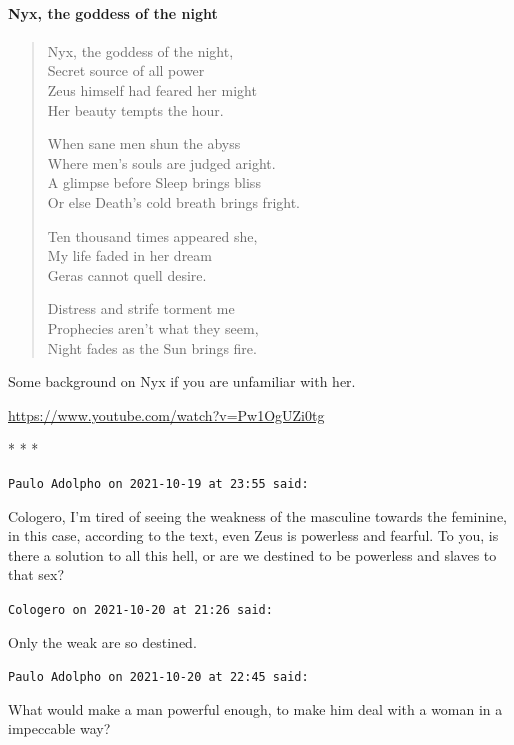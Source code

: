 \paragraph{Nyx, the goddess of the night}

\begin{verse}
Nyx, the goddess of the night,\\
Secret source of all power\\
Zeus himself had feared her might\\
Her beauty tempts the hour.

When sane men shun the abyss\\
Where men's souls are judged aright.\\
A glimpse before Sleep brings bliss\\
Or else Death's cold breath brings fright.

Ten thousand times appeared she,\\
My life faded in her dream\\
Geras cannot quell desire.

Distress and strife torment me\\
Prophecies aren't what they seem,\\
Night fades as the Sun brings fire.
\end{verse}

Some background on Nyx if you are unfamiliar with her.

\url{https://www.youtube.com/watch?v=Pw1OgUZi0tg}


\begin{center}* * *\end{center}

\begin{footnotesize}
\begin{sffamily}
\texttt{Paulo Adolpho on 2021-10-19 at 23:55 said:}

Cologero, I'm tired of seeing the weakness of the masculine towards the feminine, in this case, according to the text, even Zeus is powerless and fearful. To you, is there a solution to all this hell, or are we destined to be powerless and slaves to that sex?

\hfill

\texttt{Cologero on 2021-10-20 at 21:26 said:}

Only the weak are so destined.

\hfill

\texttt{Paulo Adolpho on 2021-10-20 at 22:45 said:}

What would make a man powerful enough, to make him deal with a woman in a impeccable way?


\hfill

\end{sffamily}
\end{footnotesize}

